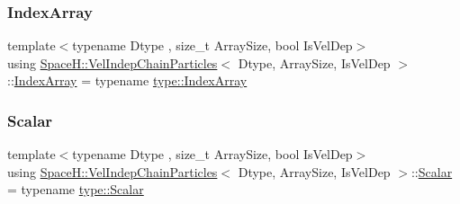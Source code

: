 \mbox{\label{class_space_h_1_1_vel_indep_chain_particles_a48b9183f8d68fe8af42bf405125d450c}} 
\subsubsection{\texorpdfstring{Index\+Array}{IndexArray}\hspace{0.1cm}{\footnotesize\ttfamily [2/2]}}
{\footnotesize\ttfamily template$<$typename Dtype , size\+\_\+t Array\+Size, bool Is\+Vel\+Dep$>$ \\
using \mbox{\hyperlink{class_space_h_1_1_vel_indep_chain_particles}{Space\+H\+::\+Vel\+Indep\+Chain\+Particles}}$<$ Dtype, Array\+Size, Is\+Vel\+Dep $>$\+::\mbox{\hyperlink{class_space_h_1_1_vel_indep_chain_particles_a48b9183f8d68fe8af42bf405125d450c}{Index\+Array}} =  typename \mbox{\hyperlink{struct_space_h_1_1_proto_type_a276a37c81faf08681b57e8082f3f6c1b}{type\+::\+Index\+Array}}}

\mbox{\label{class_space_h_1_1_vel_indep_chain_particles_a1538b2477abc1c908faba5f2915c25e4}} 
\subsubsection{\texorpdfstring{Scalar}{Scalar}\hspace{0.1cm}{\footnotesize\ttfamily [1/2]}}
{\footnotesize\ttfamily template$<$typename Dtype , size\+\_\+t Array\+Size, bool Is\+Vel\+Dep$>$ \\
using \mbox{\hyperlink{class_space_h_1_1_vel_indep_chain_particles}{Space\+H\+::\+Vel\+Indep\+Chain\+Particles}}$<$ Dtype, Array\+Size, Is\+Vel\+Dep $>$\+::\mbox{\hyperlink{class_space_h_1_1_vel_indep_particles_aeb47d8131b30ed790320ff634f0d6af1}{Scalar}} =  typename \mbox{\hyperlink{struct_space_h_1_1_proto_type_af3c8245d83d9db64749882920de5c274}{type\+::\+Scalar}}}

\mbox{\label{class_space_h_1_1_vel_indep_chain_particles_a1538b2477abc1c908faba5f2915c25e4}} 
